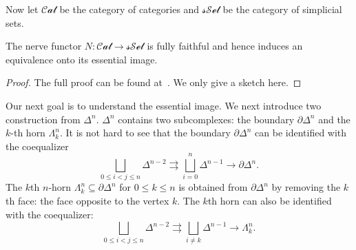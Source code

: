 Now let \(\mathcal{Cat}\) be the category of categories and \(\mathcal{sSet}\) be the category of simplicial sets.

\begin{lemma}
    The nerve functor \(N:\mathcal{Cat}\rightarrow \mathcal{sSet}\) is fully faithful and hence induces an equivalence onto its essential image.
\end{lemma}
\begin{proof}
    The full proof can be found at~\cite[\href{https://kerodon.net/tag/002Z}{Tag 002Z}]{lurieKerodon2025}. We only give a sketch here.
\end{proof}

Our next goal is to understand the essential image. We next introduce two construction from \(\Delta^n\). \(\Delta^n\) contains two subcomplexes: the boundary \(\partial \Delta^n\) and the \(k\)-th horn \(\Lambda^n_k\). It is not hard to see that the boundary \(\partial \Delta^n\) can be identified with the coequalizer
\[\bigsqcup_{0\leq i<j\leq n} \Delta^{n-2}\rightrightarrows \bigsqcup_{i=0}^n \Delta^{n-1}\rightarrow \partial \Delta^n.\]
The \(k\)th \(n\)-horn \(\Lambda_k^n\subseteq \partial \Delta^n\) for \(0\leq k\leq n\) is obtained from \(\partial \Delta^n\) by removing the \(k\)th face: the face opposite to the vertex \(k\). The \(k\)th horn can also be identified with the coequalizer:
\[\bigsqcup_{0\leq i<j\leq n} \Delta^{n-2}\rightrightarrows \bigsqcup_{i\neq k} \Delta^{n-1}\rightarrow \Lambda^n_k.\]

